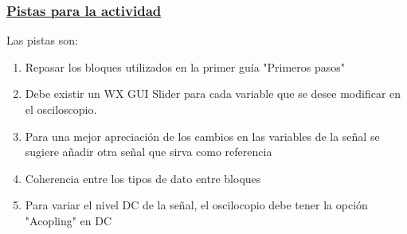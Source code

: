 	
		
	\begin{frame}

	\frametitle{\underline{\textbf{Pistas para la actividad}}}

	Las pistas son:
	\begin{enumerate}[1.]

	\item {Repasar los bloques utilizados en la primer guía "Primeros pasos"}\\
	\item {Debe existir un WX GUI Slider para cada variable que se desee modificar en el osciloscopio.}\\
	\item {Para una mejor apreciación  de los cambios en las variables de la señal se sugiere añadir otra señal que sirva como referencia}\\
	\item {Coherencia entre los tipos de dato entre bloques}\\
	\item {Para variar el nivel DC de la señal, el oscilocopio debe tener la opción "Acopling" en DC}\\
	
	\end{enumerate}
	\end{frame}
	


